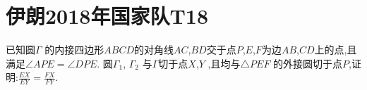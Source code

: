 \documentclass[]{article}
\title{}
\author{}
\date{}
\begin{document}
\maketitle
\section{伊朗2018年国家队T18}{
已知圆$\Gamma$ 的内接四边形$ABCD$的对角线$AC$,$BD$交于点$P$,$E$,$F$为边$AB$,$CD$上的点,且满足$\angle APE = \angle DPE$. 圆$\Gamma_1$,  $\Gamma_2$ 与$\Gamma$切于点$X$,$Y$ ,且均与$\triangle PEF$ 的外接圆切于点$P$,证明:$\frac{EX}{EY}=\frac{FX}{FY}$.
}
\end{document}
